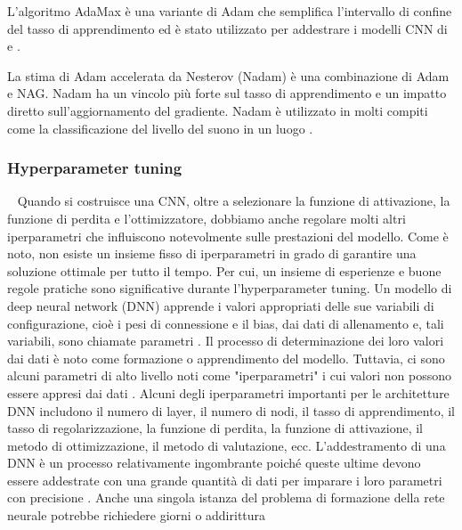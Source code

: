 \begin{itemize}
          L'algoritmo AdaMax \cite{kingma2014adam} è una variante di Adam che semplifica l'intervallo di confine 
          del tasso di apprendimento ed è stato utilizzato per addestrare i modelli CNN di \cite{van2018predicting} e
          \cite{niklaus2017video}.

          La stima di Adam accelerata da Nesterov (Nadam) \cite{dozat2016incorporating} è una combinazione di Adam 
          e NAG. Nadam ha un vincolo più forte sul tasso di apprendimento e un impatto diretto sull'aggiornamento 
          del gradiente. Nadam è utilizzato in molti compiti come la classificazione del livello del suono in un 
          luogo \cite{nguyen2018convolutional,schindler2018multi}.
\end{itemize}

\subsubsection{Hyperparameter tuning}~\newline
Quando si costruisce una CNN, oltre a selezionare la funzione di attivazione, la funzione di perdita e l'ottimizzatore,
dobbiamo anche regolare molti altri iperparametri che influiscono notevolmente sulle prestazioni del modello. Come è
noto, non esiste un insieme fisso di iperparametri in grado di garantire una soluzione ottimale per tutto il tempo. 
Per cui, un insieme di esperienze e buone regole pratiche sono significative durante l'hyperparameter tuning. 
Un modello di deep neural network (DNN) apprende i valori appropriati delle sue variabili di configurazione, 
cioè i pesi di connessione e il bias, dai dati di allenamento e, tali variabili, sono chiamate parametri
\cite{nasrabadi2007pattern}. 
Il processo di determinazione dei loro valori dai dati è noto come formazione o apprendimento del modello.
Tuttavia, ci sono alcuni parametri di alto livello noti come "iperparametri" i cui valori non possono essere 
appresi dai dati \cite{bergstra2011algorithms}. Alcuni degli iperparametri importanti per le architetture DNN 
includono il numero di layer, il numero di nodi, il tasso di apprendimento, il tasso di regolarizzazione, 
la funzione di perdita, la funzione di attivazione, il metodo di ottimizzazione, il metodo di valutazione, ecc.
L'addestramento di una DNN è un processo relativamente ingombrante poiché queste ultime devono essere
addestrate con una grande quantità di dati per imparare i loro parametri con precisione \cite{lecun2015deep,
schmidhuber2015deep}. 
Anche una singola istanza del problema di formazione della rete neurale potrebbe richiedere giorni o addirittura
